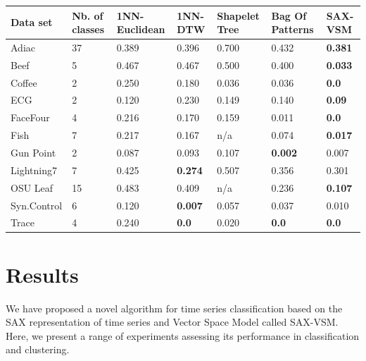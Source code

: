 \documentclass[conference]{IEEEtran}
\begin{document}
\begin{footnotesize}
\begin{table}[t]
\begin{tabularx}{\linewidth}{@{} l *6X @{}}
Data set & Nb. of classes & 1NN-Euclidean & 1NN-DTW & Shapelet Tree &  Bag Of \mbox{Patterns} & SAX-VSM\\\midrule
Adiac             &37  & 0.389   & 0.396           & 0.700        & 0.432         & \textbf{0.381}\\
Beef              &5   & 0.467   & 0.467           & 0.500        & 0.400         & \textbf{0.033}\\
Coffee           &2    & 0.250   & 0.180           & 0.036     & 0.036     & \textbf{0.0} \\
ECG               &2   & 0.120   & 0.230           & 0.149     & 0.140   & \textbf{0.09} \\
FaceFour        &4     & 0.216   & 0.170           & 0.159     & 0.011            & \textbf{0.0} \\
Fish               &7   & 0.217   & 0.167           & n/a     & 0.074            & \textbf{0.017} \\
Gun Point      &2      & 0.087   & 0.093           & 0.107     & \textbf{0.002}     & 0.007 \\
Lightning7     &7      & 0.425   & \textbf{0.274}  & 0.507     & 0.356            & 0.301 \\
OSU Leaf      &15   & 0.483   & 0.409  & n/a     & 0.236            & \textbf{0.107} \\
Syn.Control  &6   & 0.120   & \textbf{0.007}  & 0.057     & 0.037            & 0.010 \\
Trace            &4   & 0.240   & \textbf{0.0}    & 0.020     & \textbf{0.0}            & \textbf{0.0} \\

\bottomrule[1.25pt]
\end{tabularx}
\end{table}
\end{footnotesize}

\section{Results} \label{results}
We have proposed a novel algorithm for time series classification based on the SAX
representation of time series and Vector Space Model called SAX-VSM. Here, we present 
a range of experiments assessing its performance in classification and clustering.
\end{document}
